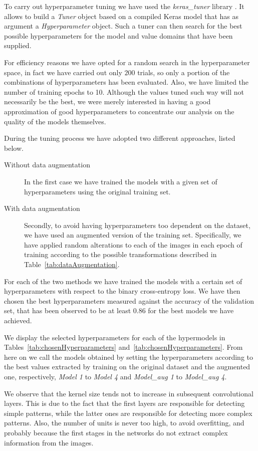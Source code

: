 
   
To carry out hyperparameter tuning we have used the \textit{keras\_tuner} library \cite{omalley2019kerastuner}. It allows to build a \textit{Tuner} object based on a compiled Keras model that has as argument a \textit{Hyperparameter} object. Such a tuner can then search for the best possible hyperparameters for the model and value domains that have been supplied. 

For efficiency reasons we have opted for a random search in the hyperparameter space, in fact we have carried out only $200$ trials, so only a portion of the combinations of hyperparameters has been evaluated. Also, we have limited the number of training epochs to 10. Although the values tuned such way will not necessarily be the best, we were merely interested in having a good approximation of good hyperparameters to concentrate our analysis on the quality of the models themselves.

During the tuning process we have adopted two different approaches, listed below. 
\begin{description}
    \item[Without data augmentation]  In the first case we have trained the models with a given set of hyperparameters using the original training set.
    \item[With data augmentation]  Secondly, to avoid having hyperparameters too dependent on the dataset, we have used an augmented version of the training set. Specifically, we have applied random alterations  to each of the images in each epoch of training according to the possible transformations described in Table~\ref{tab:dataAugmentation}.
\end{description}

For each of the two methods we have trained the models with a certain set of hyperparameters with respect to the binary cross-entropy loss. We have then chosen the best hyperparameters measured against the accuracy of the validation set, that has been observed to be at least $0.86$ for the best models we have achieved. 

We display the selected hyperparameters for each of the hypermodels in Tables~\ref{tab:chosenHyperparameters} and~\ref{tab:chosenHyperparameters}. From here on we call the models obtained by setting the hyperparameters according to the best values extracted by training on the original dataset and the augmented one, respectively, \textsl{Model 1} to \textsl{Model 4} and \textsl{Model\_aug 1} to \textsl{Model\_aug 4}. 

We observe that the kernel size tends not to increase in subsequent convolutional layers. This is due to the fact that the first layers are responsible for detecting simple patterns, while the latter ones are responsible for detecting more complex patterns. Also, the number of units is never too high, to avoid overfitting, and probably because the first stages in the networks do not extract complex information from the images.








